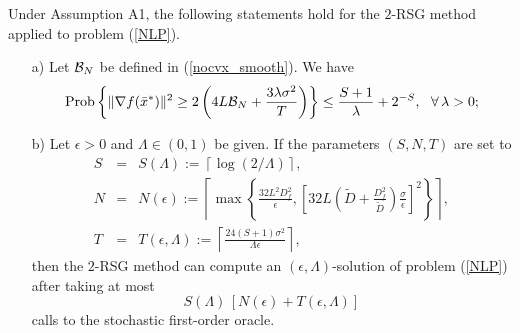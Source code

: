 \documentclass[final]{siamltex}
\newcommand{\beq}{\begin{equation}}
\newcommand{\eeq}{\end{equation}}
\newcommand{\beqa}{\begin{eqnarray}}
\newcommand{\eeqa}{\end{eqnarray}}
\def\eqnok#1{(\ref{#1})}
\def\prob{{\rm Prob}}
\def\prob{\mathop{\rm Prob}}
\begin{document}
\begin{theorem} \label{2RSG_theorem}
Under Assumption A1, the following statements hold for the $2$-RSG method applied
to problem \eqnok{NLP}.
\begin{itemize}
\item [a)] Let ${\cal B}_N$ be defined in \eqnok{nocvx_smooth}. We have
\beq \label{2RSG_conv1}
\prob\left\{
\|\nabla f(\bar x^*)\|^2 \ge 2 \left(4 L {\cal B}_N + \frac{3 \lambda \sigma^2}{T} \right)
\right\} \le \frac{S+1}{\lambda} + 2^{-S}, \ \
\forall \, \lambda > 0;
\eeq
\item [b)] Let $\epsilon > 0$ and $\Lambda \in (0,1)$ be given. If the parameters $(S,N,T)$ are set to
\beqa
S &=& S(\Lambda) := \left \lceil \log (2/ \Lambda) \right \rceil, \label{def_S}\\
N &=& N(\epsilon) := \left \lceil \max \left\{ \frac{32 L^2 D_f^2}{\epsilon}, \left[32 L \left( \tilde D + \frac{D_f^2}{\tilde D}\right)
\frac{\sigma}{\epsilon} \right]^2 \right\} \right \rceil, \label{def_N} \\
T &=& T(\epsilon,\Lambda):= \left \lceil \frac{24 (S+1) \sigma^2}{\Lambda \epsilon} \right \rceil,\label{def_Tbar}
\eeqa
then the $2$-RSG method can compute an $(\epsilon, \Lambda)$-solution of problem \eqnok{NLP}
after taking at most
\beq \label{bnd_compl}
S(\Lambda) \, \left[ N(\epsilon) + T(\epsilon, \Lambda)\right]
\eeq
calls to the stochastic first-order oracle.
\end{itemize}
\end{theorem}
\end{document}

